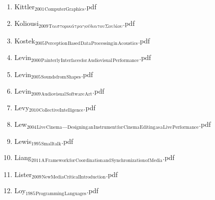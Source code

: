 \documentclass[11pt]{article}
\begin{document}
\begin{enumerate}
\begin{enumerate}
\begin{enumerate}
\begin{enumerate}
\begin{enumerate}
\item Kittler$_{\text{2001}}$$_{\text{ComputerGraphics}}$.pdf
\label{sec-1-1-1-1-7-1-1-50}

\item Koliousi$_{\text{2009}}$$_{\text{Τα}}$$_{\text{ιστορικά}}$$_{\text{τραγούδια}}$$_{\text{του}}$$_{\text{Σουλίου}}$.pdf
\label{sec-1-1-1-1-7-1-1-51}

\item Kostek$_{\text{2005}}$$_{\text{Perception}}$$_{\text{Based}}$$_{\text{Data}}$$_{\text{Processing}}$$_{\text{in}}$$_{\text{Acoustics}}$.pdf
\label{sec-1-1-1-1-7-1-1-52}

\item Levin$_{\text{2000}}$$_{\text{Painterly}}$$_{\text{Interfaces}}$$_{\text{for}}$$_{\text{Audiovisual}}$$_{\text{Performance}}$.pdf
\label{sec-1-1-1-1-7-1-1-53}

\item Levin$_{\text{2005}}$$_{\text{Sounds}}$$_{\text{from}}$$_{\text{Shapes}}$.pdf
\label{sec-1-1-1-1-7-1-1-54}

\item Levin$_{\text{2009}}$$_{\text{Audiovisual}}$$_{\text{Software}}$$_{\text{Art}}$.pdf
\label{sec-1-1-1-1-7-1-1-55}

\item Levy$_{\text{2010}}$$_{\text{CollectiveIntelligence}}$.pdf
\label{sec-1-1-1-1-7-1-1-56}

\item Lew$_{\text{2004}}$$_{\text{Live}}$$_{\text{Cinema}}$\_$_{\text{Designing}}$$_{\text{an}}$$_{\text{Instrument}}$$_{\text{for}}$$_{\text{Cinema}}$$_{\text{Editing}}$$_{\text{as}}$$_{\text{a}}$$_{\text{Live}}$$_{\text{Performance}}$.pdf
\label{sec-1-1-1-1-7-1-1-57}

\item Lewis$_{\text{1995}}$$_{\text{Smalltalk}}$.pdf
\label{sec-1-1-1-1-7-1-1-58}

\item Liang$_{\text{2011}}$$_{\text{A}}$$_{\text{Framework}}$$_{\text{for}}$$_{\text{Coordination}}$$_{\text{and}}$$_{\text{Synchronization}}$$_{\text{of}}$$_{\text{Media}}$.pdf
\label{sec-1-1-1-1-7-1-1-59}

\item Lister$_{\text{2009}}$$_{\text{NewMediaCriticalIntroduction}}$.pdf
\label{sec-1-1-1-1-7-1-1-60}

\item Loy$_{\text{1985}}$$_{\text{Programming}}$$_{\text{Languages}}$.pdf
\label{sec-1-1-1-1-7-1-1-61}


\end{enumerate}
\end{enumerate}
\end{enumerate}
\end{enumerate}
\end{enumerate}
\end{document}
